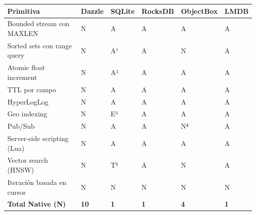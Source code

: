 {\def\LTcaptype{none} %
\begin{longtable}[]{@{}
  >{\raggedright\arraybackslash}p{}
  >{\centering\arraybackslash}p{}
  >{\centering\arraybackslash}p{}
  >{\centering\arraybackslash}p{}
  >{\centering\arraybackslash}p{}
  >{\centering\arraybackslash}p{}@{}}
\toprule\noalign{}
\begin{minipage}[b]{\linewidth}\raggedright
Primitiva
\end{minipage} & \begin{minipage}[b]{\linewidth}\centering
Dazzle
\end{minipage} & \begin{minipage}[b]{\linewidth}\centering
SQLite
\end{minipage} & \begin{minipage}[b]{\linewidth}\centering
RocksDB
\end{minipage} & \begin{minipage}[b]{\linewidth}\centering
ObjectBox
\end{minipage} & \begin{minipage}[b]{\linewidth}\centering
LMDB
\end{minipage} \\
\midrule\noalign{}
\endhead
\bottomrule\noalign{}
\endlastfoot
Bounded stream con MAXLEN & N & A & A & A & A \\
Sorted sets con range query & N & A¹ & A & N & A \\
Atomic float increment & N & A² & A & A & A \\
TTL por campo & N & A & A & A & A \\
HyperLogLog & N & A & A & A & A \\
Geo indexing & N & E³ & A & A & A \\
Pub/Sub & N & A & A & N⁴ & A \\
Server-side scripting (Lua) & N & A & A & A & A \\
Vector search (HNSW) & N & T⁵ & A & N & A \\
Iteración basada en cursor & N & N & N & N & N \\
\textbf{Total Native (N)} & \textbf{10} & \textbf{1} & \textbf{1} & \textbf{4} &
\textbf{1} \\
\end{longtable}
}

